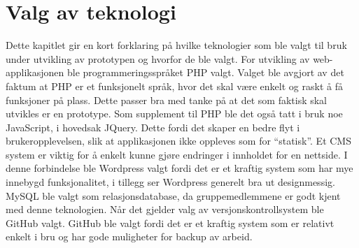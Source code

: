 \section*{Valg av teknologi}
Dette kapitlet gir en kort forklaring på hvilke teknologier som ble valgt til bruk under utvikling av prototypen og hvorfor de ble valgt. For utvikling av web-applikasjonen ble programmeringsspråket PHP valgt. Valget ble avgjort av det faktum at PHP er et funksjonelt språk, hvor det skal være enkelt og raskt å få funksjoner på plass. Dette passer bra med tanke på at det som faktisk skal utvikles er en prototype. Som supplement til PHP ble det også tatt i bruk noe JavaScript, i hovedsak JQuery. Dette fordi det skaper en bedre flyt i brukeropplevelsen, slik at applikasjonen ikke oppleves som for ``statisk''. Et CMS system er viktig for å enkelt kunne gjøre endringer i innholdet for en nettside. I denne forbindelse ble Wordpress valgt fordi det er et kraftig system som har mye innebygd funksjonalitet, i tillegg ser Wordpress generelt bra ut designmessig.\\

MySQL ble valgt som relasjonsdatabase, da gruppemedlemmene er godt kjent med denne teknologien. Når det gjelder valg av versjonskontrollsystem ble GitHub valgt. GitHub ble valgt fordi det er et kraftig system som er relativt enkelt i bru og har gode muligheter for backup av arbeid.
